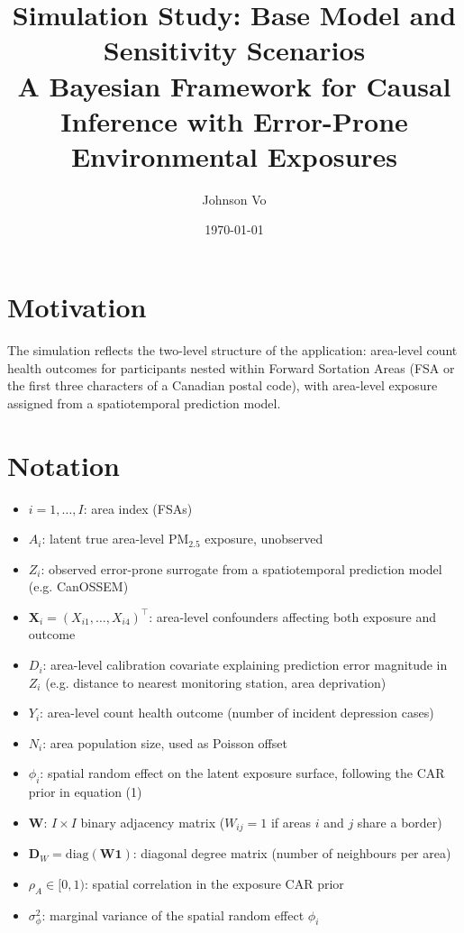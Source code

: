 \documentclass[11pt]{article}
\title{Simulation Study: Base Model and Sensitivity Scenarios\\
\large A Bayesian Framework for Causal Inference with Error-Prone Environmental Exposures}
\author{Johnson Vo}
\date{\today}
\begin{document}
\maketitle

\section{Motivation}

The simulation reflects the two-level structure of the application: area-level count
health outcomes for participants nested within Forward Sortation Areas (FSA or the first
three characters of a Canadian postal code), with area-level exposure assigned from a
spatiotemporal prediction model.

\section{Notation}

\begin{itemize}
\item $i = 1, \ldots, I$: area index (FSAs)
\item $A_i$: latent true area-level PM$_{2.5}$ exposure, unobserved
\item $Z_i$: observed error-prone surrogate from a spatiotemporal prediction model
(e.g. CanOSSEM)
\item $\mathbf{X}_i = (X_{i1}, \ldots, X_{i4})^\top$: area-level confounders affecting
both exposure and outcome
\item $D_i$: area-level calibration covariate explaining prediction error magnitude in
$Z_i$ (e.g. distance to nearest monitoring station, area deprivation)
\item $Y_i$: area-level count health outcome (number of incident depression cases)
\item $N_i$: area population size, used as Poisson offset
\item $\phi_i$: spatial random effect on the latent exposure surface, following the
CAR prior in equation (1)
\item $\mathbf{W}$: $I \times I$ binary adjacency matrix ($W_{ij} = 1$ if areas $i$ and
$j$ share a border)
\item $\mathbf{D}_W = \mathrm{diag}(\mathbf{W}\mathbf{1})$: diagonal degree matrix
(number of neighbours per area)
\item $\rho_A \in [0, 1)$: spatial correlation in the exposure CAR prior
\item $\sigma_\phi^2$: marginal variance of the spatial random effect $\phi_i$
\end{itemize}
\end{document}
